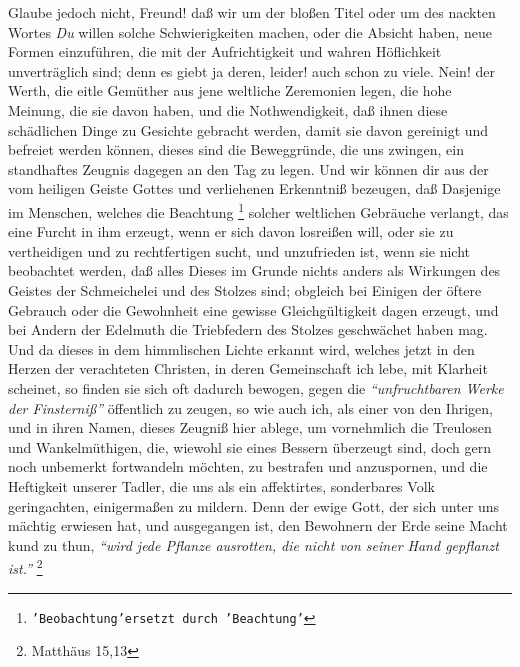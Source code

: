 Glaube jedoch nicht, Freund! daß wir um der bloßen Titel oder um des nackten
Wortes \textit{Du} willen solche Schwierigkeiten machen, oder die Absicht haben, neue
Formen einzuführen, die mit der Aufrichtigkeit und wahren Höflichkeit
unverträglich sind; denn es giebt ja deren, leider! auch schon zu viele. Nein!
der Werth, die eitle Gemüther aus jene weltliche Zeremonien legen, die hohe
Meinung, die sie davon haben, und die Nothwendigkeit, daß ihnen diese
schädlichen Dinge zu Gesichte gebracht werden, damit sie davon gereinigt und
befreiet werden  können, dieses sind die Beweggründe, die uns zwingen, ein
standhaftes Zeugnis dagegen an den Tag zu legen. Und wir können dir aus der vom
heiligen Geiste Gottes und verliehenen Erkenntniß bezeugen, daß Dasjenige im
Menschen, welches die Beachtung
\footnote{\texttt{'Beobachtung'ersetzt durch 'Beachtung'}} solcher weltlichen Gebräuche verlangt, das
eine Furcht in ihm erzeugt, wenn er sich davon losreißen will, oder sie zu
vertheidigen und zu rechtfertigen sucht, und unzufrieden ist, wenn sie nicht
beobachtet werden, daß alles Dieses im Grunde nichts anders als Wirkungen des
Geistes der Schmeichelei und des Stolzes sind; obgleich bei Einigen der öftere
Gebrauch oder die Gewohnheit eine gewisse Gleichgültigkeit dagen erzeugt, und
bei Andern der Edelmuth die Triebfedern des Stolzes geschwächet haben mag. Und
da dieses in dem himmlischen Lichte erkannt wird, welches jetzt in den Herzen
der verachteten Christen, in deren Gemeinschaft ich lebe, mit Klarheit scheinet,
so finden sie sich oft dadurch bewogen, gegen die \textit{"`unfruchtbaren Werke der
Finsterniß"'} öffentlich zu zeugen, so wie auch ich, als einer von den Ihrigen,
und in ihren Namen, dieses Zeugniß hier ablege, um vornehmlich die Treulosen und
Wankelmüthigen, die, wiewohl sie eines Bessern überzeugt sind, doch gern noch
unbemerkt fortwandeln möchten, zu bestrafen und anzuspornen, und die Heftigkeit
unserer Tadler, die uns als ein affektirtes, sonderbares Volk geringachten,
einigermaßen zu mildern. Denn der ewige Gott, der sich unter uns mächtig
erwiesen hat, und ausgegangen ist, den Bewohnern der Erde seine Macht kund zu
thun,
\textit{"`wird jede Pflanze ausrotten, die nicht von seiner Hand gepflanzt
ist."'}
\footnote{Matthäus 15,13}

\medskip

